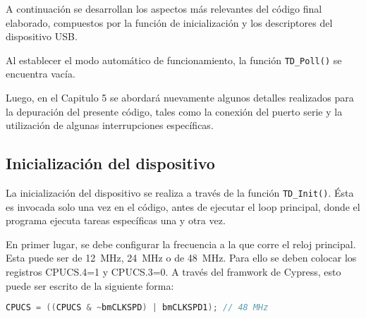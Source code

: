 A continuación se desarrollan los aspectos más relevantes del código final elaborado, compuestos por la función de inicialización y los descriptores del dispositivo USB.%

Al establecer el modo automático de funcionamiento, la función \verb|TD_Poll()| se encuentra vacía.%

Luego, en el Capitulo 5 se abordará nuevamente algunos detalles realizados para la depuración del presente código, tales como la conexión del puerto serie y la utilización de algunas interrupciones específicas.

\subsection{Inicialización del dispositivo}
	La inicialización del dispositivo se realiza a través de la función \verb|TD_Init()|. Ésta es invocada solo una vez en el código, antes de ejecutar el loop principal, donde el programa ejecuta tareas específicas una y otra vez.%
	
	En primer lugar, se debe configurar la frecuencia a la que corre el reloj principal. Esta puede ser de \SI{12}{\mega\hertz}, \SI{24}{\mega\hertz} o de \SI{48}{\mega\hertz}. Para ello se deben colocar los registros CPUCS.4=1 y CPUCS.3=0. A través del framwork de Cypress, esto puede ser escrito de la siguiente forma:
	
	\begin{lstlisting}[language=C,backgroundcolor=\color{gray!30}]
	CPUCS = ((CPUCS & ~bmCLKSPD) | bmCLKSPD1); // 48 MHz
	\end{lstlisting}

